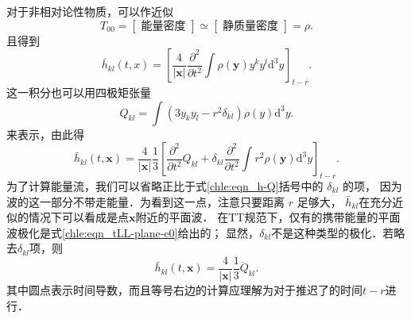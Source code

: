 对于非相对论性物质，可以作近似
\begin{equation}
	T_{00}=[\text { 能量密度 }] \simeq[\text { 静质量密度 }]=\rho .
\end{equation}
且得到
\begin{equation}
	\bar{h}_{kl}(t, x)= \left[\frac{4}{|\boldsymbol{x}|} \frac{\partial^{2}}{\partial t^{2}} 
	\int \rho\left(\boldsymbol{y}\right) y^{k} y^{l} \mathrm{d}^{3} y^{}\right]_{t-r} .
\end{equation}
这一积分也可以用四极矩张量
\begin{equation}
	Q_{kl}=\int\left(3 y_{k} y_{l}-r^{2} \delta_{kl} \right) \rho(y) \mathrm{d}^{3} y .
\end{equation}
来表示，由此得
\begin{equation}\label{chle:eqn_h-Q}
	\bar{h}_{kl}(t, \boldsymbol{x})= \frac{4}{|\boldsymbol{x}|} \frac{1}{3}
	\left[\frac{\partial^{2}}{\partial t^{2}} Q_{kl}+\delta_{kl} \frac{\partial^{2}}{\partial t^{2}} 
	\int r^{2} \rho(\boldsymbol{y}) \mathrm{d}^{3} y\right]_{t-r} .
\end{equation}
为了计算能量流，我们可以省略正比于式\eqref{chle:eqn_h-Q}括号中的 $\delta_{kl}$ 的项，
因为波的这一部分不带走能量．为看到这一点，注意只要距离 $r$ 足够大，
$\bar{h}_{kl}$在充分近似的情况下可以看成是点$\boldsymbol{x}$附近的平面波．
在TT规范下，仅有的携带能量的平面波极化是式\eqref{chle:eqn_tLL-plane-e0}给出的；
显然，$\delta_{kl}$不是这种类型的极化．若略去$\delta_{kl}$项，则
\begin{equation*}
	\bar{h}_{kl}(t, \boldsymbol{x})= \frac{4}{|\boldsymbol{x}|} \frac{1}{3} \ddot{Q}_{kl} .
\end{equation*}
其中圆点表示时间导数，而且等号右边的计算应理解为对于推迟了的时间$t-r$进行．

